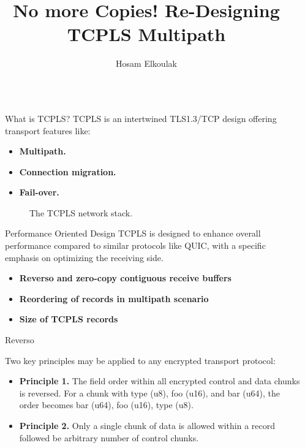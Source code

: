 \documentclass[final]{beamer}
\title{No more Copies! Re-Designing TCPLS Multipath}
\author{Hosam Elkoulak}
\institute[shortinst]{\inst{1} University of Namur}
\newlength{\sepwidth}
\newlength{\colwidth}
\newcommand{\separatorcolumn}{\begin{column}{\sepwidth}\end{column}}
\begin{document}
  \begin{frame}[t]
    \begin{columns}[t]
      \separatorcolumn

      \begin{column}{\colwidth}
        \begin{block}{What is TCPLS?}
          TCPLS is an intertwined TLS1.3/TCP design offering transport features like:
          \begin{itemize}
            \item \textbf{Multipath.}
            \item \textbf{Connection migration.}
            \item \textbf{Fail-over.}
          \end{itemize}
          \begin{figure}
            \centering
            
            \caption{The TCPLS network stack.}
            \label{fig:tcpls}
          \end{figure}
        \end{block}

        \begin{block}{Performance Oriented Design}
          TCPLS is designed to enhance overall performance compared to similar protocols like QUIC,
          with a specific emphasis on optimizing the receiving side.
          \begin{itemize}
            \item \textbf{Reverso and zero-copy contiguous receive buffers}
            \item \textbf{Reordering of records in multipath scenario}
            \item \textbf{Size of TCPLS records}
          \end{itemize}

        \end{block}

        \begin{block}{Reverso\cite{rochet2024improvingencryptedtransportprotocol}}

          Two key principles may be applied to any encrypted transport protocol:

          \begin{itemize}
            \item \textbf{Principle 1.} The field order within all encrypted control and data chunks is reversed.
            For a chunk with type (u8), foo (u16), and bar (u64), the order becomes bar (u64), foo (u16), type (u8).
            \item \textbf{Principle 2.} Only a single chunk of data is allowed within a record followed be arbitrary
            number of control chunks.
          \end{itemize}
        \end{block}


\end{column}
\end{columns}
\end{frame}
\end{document}
